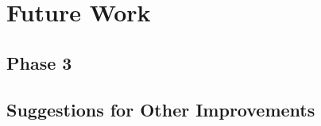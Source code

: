 
\chapter{Future Work} %

\label{Chapter6} %



\section{Phase 3}





\section{Suggestions for Other Improvements}
